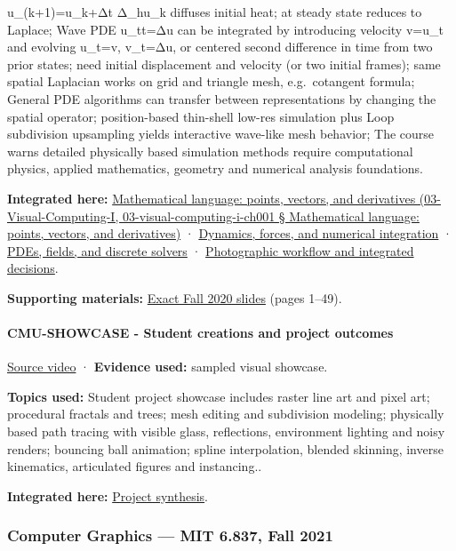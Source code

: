 u\_(k+1)=u\_k+Δt Δ\_hu\_k diffuses initial heat; at steady state reduces to Laplace; Wave PDE u\_tt=Δu can be integrated by introducing velocity v=u\_t and evolving u\_t=v, v\_t=Δu, or centered second difference in time from two prior states; need initial displacement and velocity (or two initial frames); same spatial Laplacian works on grid and triangle mesh, e.g.~cotangent formula; General PDE algorithms can transfer between representations by changing the spatial operator; position-based thin-shell low-res simulation plus Loop subdivision upsampling yields interactive wave-like mesh behavior; The course warns detailed physically based simulation methods require computational physics, applied mathematics, geometry and numerical analysis foundations.

\textbf{Integrated here:} \href{}{Mathematical language: points, vectors, and derivatives (03-Visual-Computing-I, 03-visual-computing-i-ch001 § Mathematical language: points, vectors, and derivatives)} · \hyperref[04-visual-computing-ii-ch029]{Dynamics, forces, and numerical integration} · \hyperref[04-visual-computing-ii-ch030]{PDEs, fields, and discrete solvers} · \hyperref[04-visual-computing-ii-ch034]{Photographic workflow and integrated decisions}.

\textbf{Supporting materials:} \href{https://15462.courses.cs.cmu.edu/fall2020content/lectures/23_pdes/23_pdes_slides.pdf}{Exact Fall 2020 slides} (pages 1--49).

\paragraph{CMU-SHOWCASE - Student creations and project outcomes}\label{cmu-showcase---student-creations-and-project-outcomes}

\href{https://www.youtube.com/watch?v=yJ5eY3EIImA}{Source video} · \textbf{Evidence used:} sampled visual showcase.

\textbf{Topics used:} Student project showcase includes raster line art and pixel art; procedural fractals and trees; mesh editing and subdivision modeling; physically based path tracing with visible glass, reflections, environment lighting and noisy renders; bouncing ball animation; spline interpolation, blended skinning, inverse kinematics, articulated figures and instancing..

\textbf{Integrated here:} \hyperref[04-visual-computing-ii-ch034]{Project synthesis}.

\subsubsection{Computer Graphics --- MIT 6.837, Fall 2021}\label{computer-graphics-mit-6.837-fall-2021}

